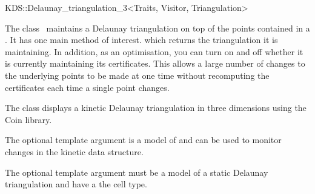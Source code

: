 

\begin{ccRefClass}{KDS::Delaunay_triangulation_3<Traits, Visitor, Triangulation>}  %


\ccDefinition
  
The class \ccRefName\ maintains a Delaunay triangulation on top of the
points contained in a . It has one main method
of interest.  which returns the triangulation it
is maintaining. In addition, as an optimisation, you can turn on and
off whether it is currently maintaining its certificates. This allows
a large number of changes to the underlying points to be made at one
time without recomputing the certificates each time a single point
changes.

The class  displays a kinetic
Delaunay triangulation in three dimensions using the Coin library.

The optional  template argument is a model of
 and can be used to monitor
changes in the kinetic data structure.

The optional  template argument must be a model of
a static Delaunay triangulation and have
 a the cell
type.



\ccTypes




\end{ccRefClass}
